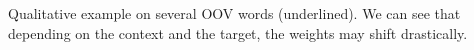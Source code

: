 \documentclass[25pt, a0paper,
               colspace=15mm, subcolspace=0mm,
               blockverticalspace=17mm,
               landscape]{tikzposter} %
\begin{document}
\begin{columns}
{  \vspace{2mm}
  Qualitative example on several OOV words (underlined). We can see that depending on the context and the target, the weights may shift drastically.
  }
  




\end{columns}
\end{document}
